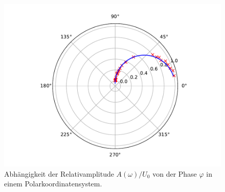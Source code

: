 \begin{figure}
    \centering
    \includegraphics[width=\textwidth]{content/data/plotd.pdf}
    \caption{Abhängigkeit der Relativamplitude $A(\omega)/U_0$ von der Phase $\varphi$ in einem Polarkoordinatensystem.}
    \label{fig:polar}
\end{figure}
\FloatBarrier

